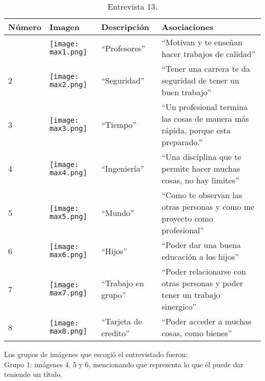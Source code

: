 \begin{table}[H]
\centering
\begin{tabular}{>{\centering\arraybackslash}m{1cm} >{\centering\arraybackslash}m{2cm} >{\arraybackslash}m{5cm}>{\arraybackslash}m{5cm}}
\hline
Número  & Imagen & Descripción & Asociaciones \\
\hline \hline

1 & \texttt{[image: max1.png]} & ``Profesores'' & ``Motivan y te enseñan hacer trabajos de calidad'' \\
\hline

2 & \texttt{[image: max2.png]} & ``Seguridad'' & ``Tener una carrera te da seguridad de tener un buen trabajo'' \\
\hline

3 & \texttt{[image: max3.png]} & ``Tiempo'' & ``Un profesional termina las cosas de manera más rápida, porque esta preparado.'' \\
\hline

4 & \texttt{[image: max4.png]} & ``Ingeniería'' & ``Una disciplina que te permite hacer muchas cosas, no hay limites'' \\
\hline

5 & \texttt{[image: max5.png]} & ``Mundo'' & ``Como te observan las otras personas y como me proyecto como profesional'' \\
\hline

6 & \texttt{[image: max6.png]} & ``Hijos'' & ``Poder dar una buena educación a los hijos'' \\
\hline

7 & \texttt{[image: max7.png]} & ``Trabajo en grupo'' & ``Poder relacionarse con otras personas y poder tener un trabajo sinergico'' \\
\hline

8 & \texttt{[image: max8.png]} & ``Tarjeta de credito'' & ``Poder acceder a muchas cosas, como bienes'' \\
\hline

\end{tabular}
\caption{Entrevista 13.}
\label{tabla:max}
\end{table}

Los grupos de imágenes que escogió el entrevistado fueron:\\

Grupo 1: imágenes 4, 5 y 6, mencionando que representa lo que él puede dar teniendo un título.\\

